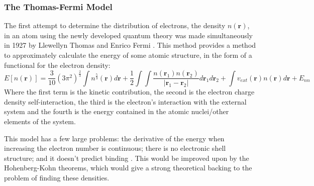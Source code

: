\documentclass[12pt]{article}
\begin{document}
\subsubsection{The Thomas-Fermi Model}
The first attempt to determine the distribution of electrons, the density $n(\mathbf r)$, in an atom using the newly developed quantum theory was made simultaneously in 1927 by Llewellyn Thomas \cite{thomas_1927} and Enrico Fermi \cite{fermi1927metodo}. This method provides a method to approximately calculate the energy of some atomic structure, in the form of a functional for the electron density:
\begin{equation}\label{eq:thomas-fermi}
	E[n(\mathbf r)] = \frac{3}{10}(3\pi^2)^{\frac{2}{3}}\int n^{\frac{5}{3}}(\mathbf r) d \mathbf r + \frac{1}{2}\int\int\frac{n(\mathbf r_1) n(\mathbf r_2)}{\left| \mathbf r_1 - \mathbf r_2\right|}d\mathbf r_1 d\mathbf r_2 + \int v_{ext}(\mathbf r) n(\mathbf r) d \mathbf r + E_{nn}
\end{equation}
Where the first term is the kinetic contribution, the second is the electron charge density self-interaction, the third is the electron's interaction with the external system and the fourth is the energy contained in the atomic nuclei/other elements of the system.

This model has a few large problems: the derivative of the energy when increasing the electron number is continuous; there is no electronic shell structure; and it doesn't predict binding \cite{lieb1977thomas}. This would be improved upon by the Hohenberg-Kohn theorems, which would give a strong theoretical backing to the problem of finding these densities.
\end{document}
